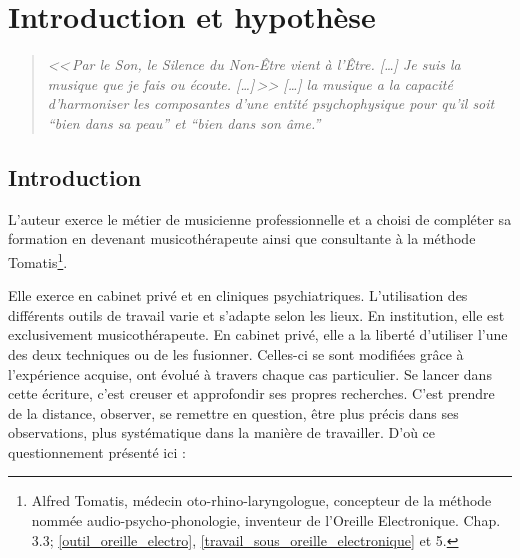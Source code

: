 \chapter{Introduction et hypothèse}

\label{jeSuisLaMusique:viret}
\begin{quotation}
\emph{<<\,\emph{Par le Son, le Silence du Non-Être vient à l'Être}. [\dots] 
\textsl{Je suis}
	\emph{la musique que je fais ou écoute}. [\dots]\,>>
[\ldots] \emph{la musique a la capacité d'harmoniser
les composantes d'une entité psychophysique pour qu'il soit ``bien
dans sa peau'' et ``bien dans son âme.}''}\, \autocite[ch. 1,  p. 8]{viret:b}
\end{quotation}

\section{Introduction}


L'auteur exerce le métier de musicienne professionnelle et a  choisi de 
compléter sa formation en devenant musicothérapeute  ainsi que consultante à la 
méthode Tomatis\footnote{Alfred Tomatis, médecin oto-rhino-laryngologue, 
concepteur de la méthode nommée audio-psycho-phonologie, inventeur de l'Oreille 
Electronique.  Chap. 3.3; \ref{outil_oreille_electro},
 \ref{travail_sous_oreille_electronique} et 5.}.  



Elle exerce en cabinet privé et en cliniques psychiatriques. L'utilisation des 
différents outils de travail varie et s'adapte selon les lieux. En institution, 
elle est exclusivement musicothérapeute. En cabinet
privé, elle a la liberté d'utiliser l'une des deux techniques ou de les 
fusionner. Celles-ci se sont modifiées grâce à  l'expérience acquise, ont 
évolué  
à travers chaque cas particulier.
 Se lancer dans cette écriture, c'est creuser et approfondir ses propres 
recherches. C'est prendre de la distance, observer, se remettre en question, 
être plus précis dans ses observations, plus systématique dans la manière de 
travailler. D'où ce questionnement présenté ici : 


